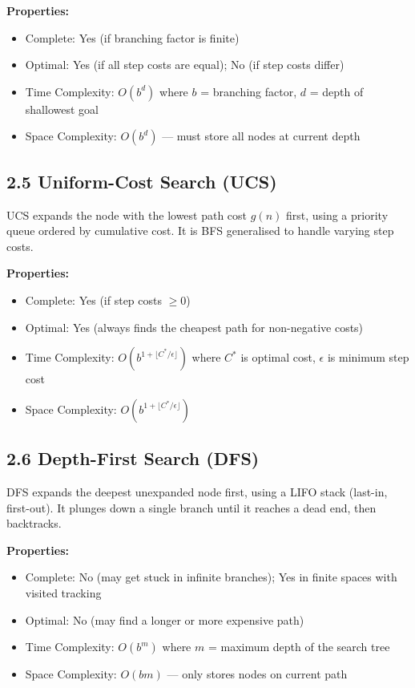 \documentclass[12pt,a4paper]{article}
\begin{document}
\textbf{Properties:}
\begin{itemize}[leftmargin=1.4em]
  \item Complete: Yes (if branching factor is finite)
  \item Optimal: Yes (if all step costs are equal); No (if step costs differ)
  \item Time Complexity: $O(b^d)$ where $b$ = branching factor, $d$ = depth of shallowest goal
  \item Space Complexity: $O(b^d)$ --- must store all nodes at current depth
\end{itemize}

\subsection*{2.5 Uniform-Cost Search (UCS)}

UCS expands the node with the lowest path cost $g(n)$ first, using a priority queue ordered by cumulative cost. It is BFS generalised to handle varying step costs.

\textbf{Properties:}
\begin{itemize}[leftmargin=1.4em]
  \item Complete: Yes (if step costs $\geq 0$)
  \item Optimal: Yes (always finds the cheapest path for non-negative costs)
  \item Time Complexity: $O(b^{1+\lfloor C^*/\epsilon \rfloor})$ where $C^*$ is optimal cost, $\epsilon$ is minimum step cost
  \item Space Complexity: $O(b^{1+\lfloor C^*/\epsilon \rfloor})$
\end{itemize}

\subsection*{2.6 Depth-First Search (DFS)}

DFS expands the deepest unexpanded node first, using a LIFO stack (last-in, first-out). It plunges down a single branch until it reaches a dead end, then backtracks.

\textbf{Properties:}
\begin{itemize}[leftmargin=1.4em]
  \item Complete: No (may get stuck in infinite branches); Yes in finite spaces with visited tracking
  \item Optimal: No (may find a longer or more expensive path)
  \item Time Complexity: $O(b^m)$ where $m$ = maximum depth of the search tree
  \item Space Complexity: $O(bm)$ --- only stores nodes on current path
\end{itemize}
\end{document}
